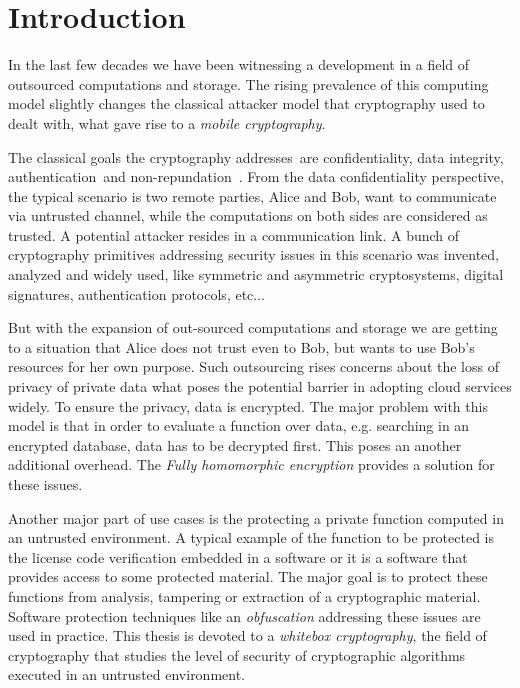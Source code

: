 \documentclass[11pt,oneside,final]{fithesis2}
\begin{document}

\chapter{Introduction}
    
    
    In the last few decades we have been witnessing a development in a field of outsourced computations and storage.
    The rising prevalence of this computing model slightly changes the classical attacker model 
    that cryptography used to dealt with, what gave rise to a \emph{mobile cryptography}.

    The classical goals the cryptography addresses~are confidentiality, data integrity, authentication~and non-repundation~\citep{Menezes:1996:HAC:548089}.
    From the data confidentiality perspective, the typical scenario is two remote parties, Alice and Bob, want to communicate via untrusted channel, while the 
    computations on both sides are considered as trusted. A potential attacker resides in a communication link.
    A bunch of cryptography primitives addressing security issues in this scenario
    was invented, analyzed and widely used, like symmetric and asymmetric cryptosystems, digital signatures, authentication protocols, etc...
    
    But with the expansion of out-sourced computations and storage we are getting to a situation that Alice does not trust even to Bob, but wants 
    to use Bob's resources for her own purpose. Such outsourcing rises concerns about the loss of privacy of private data what poses the potential
    barrier in adopting cloud services widely. To ensure the privacy, data is encrypted. The major problem with this model 
    is that in order to evaluate a function over data, e.g. searching in an encrypted database, data has to be decrypted first. This poses an another additional 
    overhead. The \emph{Fully homomorphic encryption} provides a solution for these issues.
    
    Another major part of use cases is the protecting a private function computed in an untrusted environment. A typical example
    of the function to be protected is the license code verification embedded in a software or it is a software that provides access 
    to some protected material.  The major goal is to protect these
    functions from analysis, tampering or extraction of a cryptographic material. Software protection techniques like an \emph{obfuscation}
    addressing these issues are used in practice. This thesis is devoted to a \emph{whitebox cryptography}, the field of 
    cryptography that studies the level of security of cryptographic algorithms executed in an untrusted environment.
\end{document}
